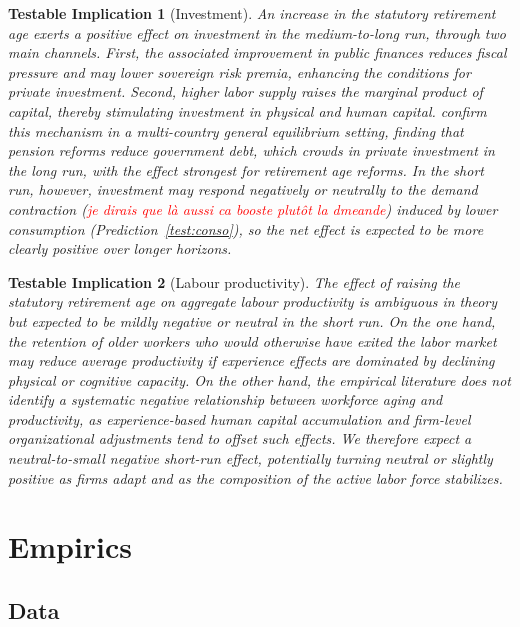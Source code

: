 \documentclass[11pt,english,a4paper, twoside, authoryear]{article}
\newtheorem{testable}{Testable Implication}
\begin{document}
\begin{testable}[Investment]\label{test:invest}
An increase in the statutory retirement age exerts a positive effect on investment in the medium-to-long run, through two main channels. First, the associated improvement in public finances reduces fiscal pressure and may lower sovereign risk premia, enhancing the conditions for private investment. Second, higher labor supply raises the marginal product of capital, thereby stimulating investment in physical and human capital. \citet{KaramMuirPereiraTuladhar2010} confirm this mechanism in a multi-country general equilibrium setting, finding that pension reforms reduce government debt, which crowds in private investment in the long run, with the effect strongest for retirement age reforms. In the short run, however, investment may respond negatively or neutrally to the demand contraction (\textcolor{red}{je dirais que là aussi ca booste plutôt la dmeande}) induced by lower consumption (Prediction~\ref{test:conso}), so the net effect is expected to be more clearly positive over longer horizons.
\end{testable}

\begin{testable}[Labour productivity]\label{test:prod}
The effect of raising the statutory retirement age on aggregate labour productivity is ambiguous in theory but expected to be mildly negative or neutral in the short run. On the one hand, the retention of older workers who would otherwise have exited the labor market may reduce average productivity if experience effects are dominated by declining physical or cognitive capacity. On the other hand, the empirical literature does not identify a systematic negative relationship between workforce aging and productivity, as experience-based human capital accumulation and firm-level organizational adjustments tend to offset such effects. We therefore expect a neutral-to-small negative short-run effect, potentially turning neutral or slightly positive as firms adapt and as the composition of the active labor force stabilizes.
\end{testable}

\section{Empirics}

\subsection{Data}
\end{document}
